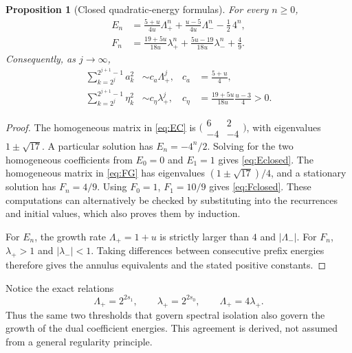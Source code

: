 \documentclass[11pt,a4paper]{article}
\newtheorem{proposition}[theorem]{Proposition}
\theoremstyle{definition}
\theoremstyle{remark}
\numberwithin{equation}{section}
\begin{document}
\begin{proposition}[Closed quadratic-energy formulas]
\label{prop:closed-energies}
For every $n\ge0$,
\begin{align}
 E_n&=\frac{5+u}{4u}\Lambda_+^n
      +\frac{u-5}{4u}\Lambda_-^n-\frac12\,4^n,
 \label{eq:Eclosed}\\
 F_n&=\frac{19+5u}{18u}\lambda_+^n
      +\frac{5u-19}{18u}\lambda_-^n+\frac49.
 \label{eq:Fclosed}
\end{align}
Consequently, as $j\to\infty$,
\begin{align}
 \sum_{k=2^j}^{2^{j+1}-1}a_k^2
 &\sim c_a\Lambda_+^j,&c_a&=\frac{5+u}{4},\label{eq:a-annulus}\\
 \sum_{k=2^j}^{2^{j+1}-1}\eta_k^2
 &\sim c_\eta\lambda_+^j,&c_\eta&=\frac{19+5u}{18u}\frac{u-3}{4}>0.
 \label{eq:eta-annulus}
\end{align}
\end{proposition}
\begin{proof}
The homogeneous matrix in \eqref{eq:EC} is
$\bigl(\begin{smallmatrix}6&2\\-4&-4\end{smallmatrix}\bigr)$,
with eigenvalues $1\pm\sqrt{17}$. A particular solution has
$E_n=-4^n/2$. Solving for the two homogeneous coefficients from $E_0=0$
and $E_1=1$ gives \eqref{eq:Eclosed}.
The homogeneous matrix in \eqref{eq:FG} has eigenvalues
$(1\pm\sqrt{17})/4$, and a stationary solution has $F_n=4/9$.
Using $F_0=1$, $F_1=10/9$ gives \eqref{eq:Fclosed}. These computations
can alternatively be checked by substituting into the recurrences and
initial values, which also proves them by induction.

For $E_n$, the growth rate $\Lambda_+=1+u$ is strictly larger than
$4$ and $|\Lambda_-|$. For $F_n$, $\lambda_+>1$ and
$|\lambda_-|<1$. Taking differences between consecutive prefix energies
therefore gives the annulus equivalents and the stated positive constants.
\end{proof}

Notice the exact relations
\begin{equation}
 \Lambda_+=2^{2s_1},\qquad \lambda_+=2^{2s_0},\qquad
 \Lambda_+=4\lambda_+.
 \label{eq:energy-exponents}
\end{equation}
Thus the same two thresholds that govern spectral isolation also govern
the growth of the dual coefficient energies. This agreement is derived,
not assumed from a general regularity principle.
\end{document}

